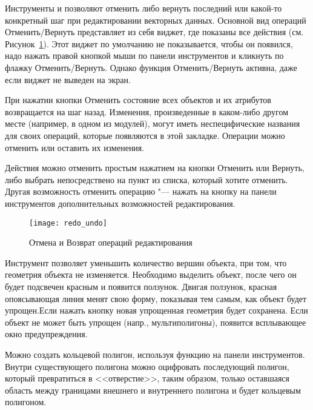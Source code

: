 
Инструменты  и
 позволяют отменить либо вернуть
последний или какой-то конкретный шаг при редактировании векторных данных.
Основной вид операций Отменить/Вернуть представляет из себя виджет, где
показаны все действия (см. Рисунок~\ref{fig:vector_redoundo}). Этот виджет
по умолчанию не показывается, чтобы он появился, надо нажать правой кнопкой
мыши по панели инструментов и кликнуть по флажку Отменить/Вернуть. Однако
функция Отменить/Вернуть активна, даже если виджет не выведен на экран.

При нажатии кнопки Отменить состояние всех объектов и их атрибутов
возвращается на шаг назад. Изменения, произведенные в каком-либо другом
месте (например, в одном из модулей), могут иметь неспецифические названия
для своих операций, которые появляются в этой закладке. Операции можно
отменить или оставить их изменения.

Действия можно отменить простым нажатием на кнопки Отменить или Вернуть,
либо выбрать непосредствено на пункт из списка, который хотите отменить.
Другая возможность отменить операцию "--- нажать на кнопку
 на панели инструментов дополнительных возможностей
редактирования.

\begin{figure}[ht]
   \centering
   \texttt{[image: redo\_undo]}
   \caption{Отмена и Возврат операций редактирования \nixcaption}\label{fig:vector_redoundo}
\end{figure}


Инструмент  позволяет уменьшить
количество вершин объекта, при том, что геометрия объекта не изменяется.
Необходимо выделить объект, после чего он будет подсвечен красным и появится
ползунок. Двигая ползунок, красная опоясывающая линия менят свою форму,
показывая тем самым, как объект будет упрощен.Если нажать кнопку 
новая упрощенная геометрия будет сохранена. Если объект не может быть
упрощен (напр., мультиполигоны), появится всплывающее окно предупреждения.


Можно создать кольцевой полигон, используя функцию
 на панели инструментов. Внутри
существующего полигона можно оцифровать последующий полигон, который
превратиться в <<отверстие>>, таким образом, только оставшаяся область
между границами внешнего и внутреннего полигона и будет кольцевым полигоном.

